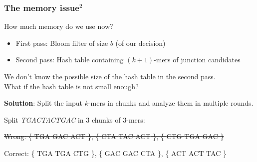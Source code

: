 \begin{frame}
	\frametitle{The memory issue$^{2}$}
	\centering
	
	How much memory do we use now?
	
	\medskip
	
	\begin{itemize}
	  \item First pass: Bloom filter of size $b$ (of our decision)
	  \item Second pass: Hash table containing $(k+1)$-mers of junction candidates
	\end{itemize}

	\medskip
	
	We don't know the possible size of the hash table in the second pass. \\
	What if the hash table is not small enough?
  
  \pause 
  
	\medskip

  \textbf{Solution}: Split the input $k$-mers in chunks and analyze them in multiple rounds.

  \medskip
  
  Split \textit{TGACTACTGAC} in $3$ chunks of $3$-mers: \\
  
  \medskip
  
  \st{
  Wrong: \{
    {\color{red}TGA} 
    {\color{blue}GAC}
    {\color{pink}ACT}
  \}, 
  \{
    {\color{green}CTA} 
    {\color{darkgreen}TAC}
    {\color{pink}ACT}
  \}, 
  \{
    {\color{orange}CTG} 
    {\color{red}TGA} 
    {\color{blue}GAC}
  \}
  }
  
  \medskip
  
  Correct: \{
    {\color{red}TGA} 
    {\color{red}TGA} 
    {\color{orange}CTG} 
  \}, 
  \{
    {\color{blue}GAC}
    {\color{blue}GAC}
    {\color{green}CTA} 
  \}, 
  \{
    {\color{pink}ACT}
    {\color{pink}ACT}
    {\color{darkgreen}TAC} 
  \}  
\end{frame}


